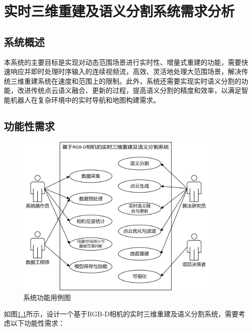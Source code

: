 
\chapter{实时三维重建及语义分割系统需求分析}

\section{系统概述}
\par 本系统的主要目标是实现对动态范围场景进行实时性、增量式重建的功能，需要快速响应并即时处理时序输入的连续视频流，高效、灵活地处理大范围场景，解决传统三维重建系统在速度和范围上的限制。此外，系统还需要实现实时语义分割的功能，改进传统点云语义融合、更新的过程，提高语义分割的精度和效率，以满足智能机器人在复杂环境中的实时导航和地图构建需求。

\section{功能性需求}

\begin{figure}[htb]
	\centering
	\includegraphics[width=0.9\textwidth]{figures/uml/case_all.png}
	\caption{系统功能用例图}
	\label{fig:case_all}
\end{figure}

\par 如图\ref{fig:case_all}所示，设计一个基于RGB-D相机的实时三维重建及语义分割系统，需要考虑以下功能性需求：

